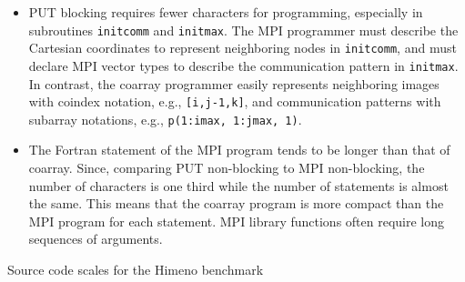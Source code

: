 \begin{itemize}
\item
PUT blocking requires fewer characters for programming,
especially in subroutines {\tt initcomm} and {\tt initmax}.
The MPI programmer must describe the Cartesian coordinates to represent neighboring nodes in {\tt initcomm}, and must declare MPI vector types to describe the communication pattern in {\tt initmax}. In contrast, the coarray programmer easily represents 
neighboring images with coindex notation, e.g., {\tt [i,j-1,k]}, and 
communication patterns with subarray notations, e.g., {\tt p(1:imax, 1:jmax, 1)}.

\item
The Fortran statement of the MPI program tends to be longer than that of coarray.
Since, comparing PUT non-blocking to MPI non-blocking,
the number of characters is one third while the number of statements is almost the same.
This means that the coarray program is more compact than the MPI program for each
statement. MPI library functions often require long sequences of arguments.

\end{itemize}


\begin{table}
 \caption{Source code scales for the Himeno benchmark}\label{tab:himeno-lines}
 \begin{center}
  
 \end{center}
\end{table}





